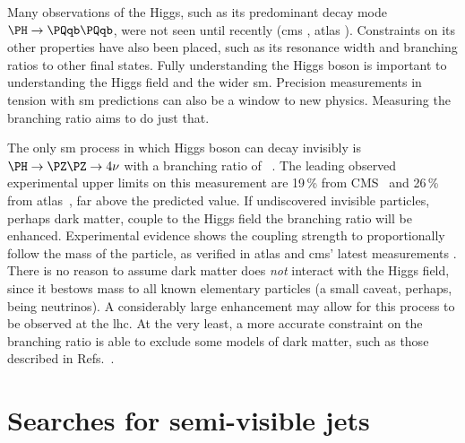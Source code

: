 Many observations of the Higgs, such as its predominant decay mode $\PH \rightarrow \Pqb\Pqb$, were not seen until recently (\acrshort{cms} \cite{Sirunyan:2018kst}, \acrshort{atlas} \cite{Aaboud:2018zhk}). Constraints on its other properties have also been placed, such as its resonance width and branching ratios \BR to other final states. Fully understanding the Higgs boson is important to understanding the Higgs field and the wider \acrlong{sm}. Precision measurements in tension with \acrshort{sm} predictions can also be a window to new physics. Measuring the \higgstoinv branching ratio aims to do just that.

The only \acrshort{sm} process in which Higgs boson can decay invisibly is $\PH \rightarrow \PZ\PZ \rightarrow 4\nu$ with a branching ratio of ~\cite{Heinemeyer:1559921}. The leading observed experimental upper limits on this measurement are 19\,\% from CMS~\cite{Sirunyan:2018owy} and 26\,\% from \acrshort{atlas}~\cite{Aaboud:2019rtt}, far above the predicted value. If undiscovered invisible particles, perhaps dark matter, couple to the Higgs field the branching ratio will be enhanced. Experimental evidence shows the coupling strength to proportionally follow the mass of the particle, as verified in \acrshort{atlas} and \acrshort{cms}' latest measurements \cite{Sopczak:2708121}. There is no reason to assume dark matter does \emph{not} interact with the Higgs field, since it bestows mass to all known elementary particles (a small caveat, perhaps, being neutrinos).  A considerably large enhancement may allow for this process to be observed at the \acrshort{lhc}. At the very least, a more accurate constraint on the branching ratio is able to exclude some models of dark matter, such as those described in Refs.~.





\section{Searches for semi-visible jets}
\label{sec:theory_svj}


